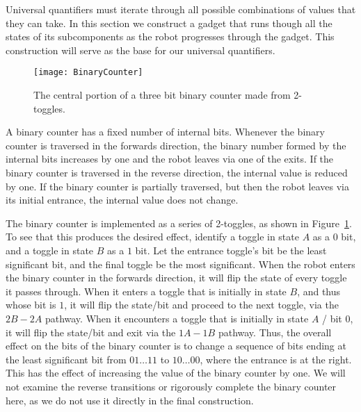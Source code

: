 Universal quantifiers must iterate through all possible combinations of values that they can take. In this section we construct a gadget that runs though all the states of its subcomponents as the robot progresses through the gadget. This construction will serve as the base for our universal quantifiers.

\begin{figure}[h!]
\centering
    \texttt{[image: BinaryCounter]}
    \caption{The central portion of a three bit binary counter made from 2-toggles.}
    \label{fig:BinaryCounter}
\end{figure}
  
A binary counter has a fixed number of internal bits.
Whenever the binary counter is traversed in the forwards direction, the binary number
formed by the internal bits increases by one and the robot leaves via one of the exits.
If the binary counter is traversed in the reverse direction, the internal value is reduced by
one. If the binary counter is partially traversed, but then the robot leaves via its initial entrance,
the internal value does not change.


The binary counter is implemented as a series of 2-toggles, as shown in Figure~\ref{fig:BinaryCounter}.
To see that this produces the desired effect, identify a toggle in state $A$ as a $0$ bit, and a toggle in state
$B$ as a $1$ bit. Let the entrance toggle's bit be the least significant bit, and the final toggle be the
most significant. When the robot enters the binary counter in the forwards direction, it will flip
the state of every toggle it passes through. When it enters a toggle that is initially in state $B$, and thus whose
bit is $1$, it will flip the state/bit and proceed to the next toggle, via the $2B - 2A$ pathway. When it
encounters a toggle that is initially in state $A$ / bit $0$, it will flip the state/bit and exit via the $1A - 1B$
pathway. Thus, the overall effect on the bits of the binary counter is to change a sequence of bits ending at the
least significant bit from $01\ldots11$ to $10\ldots00$, where the entrance is at the right.
This has the effect of increasing the value of the binary counter by one.
We will not examine the reverse transitions or rigorously complete the binary counter here, 
as we do not use it directly in the final construction. 

